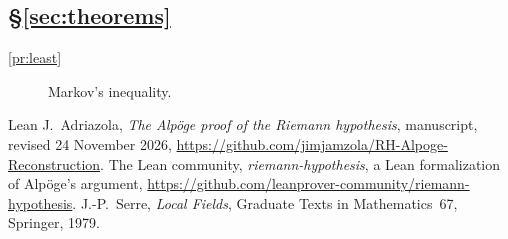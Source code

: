 \documentclass[reqno]{amsart}
\theoremstyle{definition}
\theoremstyle{plain}
\theoremstyle{remark}
\begin{document}
\subsection*{\S\ref{sec:theorems}}
\begin{description}
\item[\ref{pr:least}] Markov's inequality.
\end{description}

\begin{thebibliography}{Lean}
  J.~Adriazola, \emph{The Alp\"oge proof of the Riemann hypothesis}, manuscript, revised 24 November 2026, \url{https://github.com/jimjamzola/RH-Alpoge-Reconstruction}.
 The Lean community, \emph{riemann-hypothesis}, a Lean formalization of Alp\"oge's argument, \url{https://github.com/leanprover-community/riemann-hypothesis}.
  J.-P.~Serre, \emph{Local Fields}, Graduate Texts in Mathematics~67, Springer, 1979.
\end{thebibliography}
\end{document}
